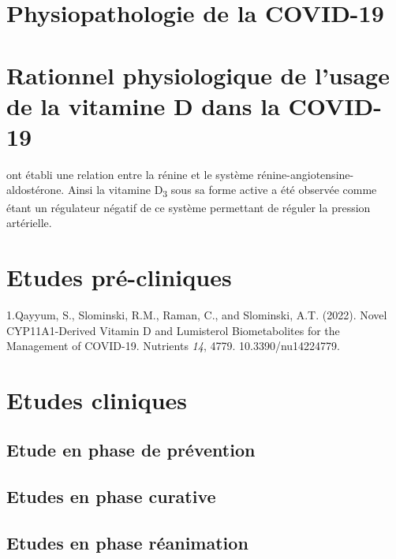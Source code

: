 \documentclass[
  a4paper,
  DIV=11,
  numbers=noendperiod,
  listof=totoc]{scrreprt}
\begin{document}
\hypertarget{physiopathologie-de-la-covid-19}{%
\section{Physiopathologie de la
COVID-19}\label{physiopathologie-de-la-covid-19}}

\hypertarget{rationnel-physiologique-de-lusage-de-la-vitamine-d-dans-la-covid-19}{%
\section{Rationnel physiologique de l'usage de la vitamine D dans la
COVID-19}\label{rationnel-physiologique-de-lusage-de-la-vitamine-d-dans-la-covid-19}}

\textcite{Li.2002} ont établi une relation entre la rénine et le système
rénine-angiotensine-aldostérone. Ainsi la vitamine D\textsubscript{3}
sous sa forme active a été observée comme étant un régulateur négatif de
ce système permettant de réguler la pression artérielle.

\hypertarget{etudes-pruxe9-cliniques}{%
\section{Etudes pré-cliniques}\label{etudes-pruxe9-cliniques}}

1.Qayyum, S., Slominski, R.M., Raman, C., and Slominski, A.T. (2022).
Novel CYP11A1-Derived Vitamin D and Lumisterol Biometabolites for the
Management of COVID-19. Nutrients \emph{14}, 4779. 10.3390/nu14224779.

\hypertarget{etudes-cliniques}{%
\section{Etudes cliniques}\label{etudes-cliniques}}

\hypertarget{etude-en-phase-de-pruxe9vention}{%
\subsection{Etude en phase de
prévention}\label{etude-en-phase-de-pruxe9vention}}

\hypertarget{etudes-en-phase-curative}{%
\subsection{Etudes en phase curative}\label{etudes-en-phase-curative}}

\hypertarget{etudes-en-phase-ruxe9animation}{%
\subsection{Etudes en phase
réanimation}\label{etudes-en-phase-ruxe9animation}}
\end{document}
